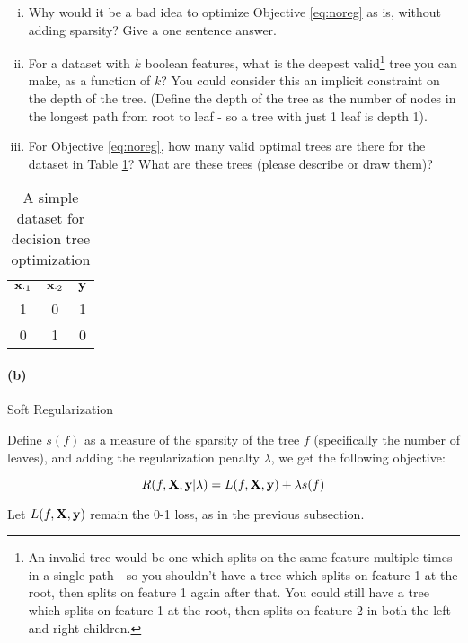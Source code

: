 \documentclass{exam}
\begin{document}
\begin{enumerate}[i.]
    \item {Why would it be a bad idea to optimize Objective \ref{eq:noreg} as is, without adding sparsity? Give a one sentence answer.}
    
    \item For a dataset with $k$ boolean features, what is the deepest valid\footnote{An invalid tree would be one which splits on the same feature multiple times in a single path - so you shouldn't have a tree which splits on feature 1 at the root, then splits on feature 1 again after that. You could still have a tree which splits on feature 1 at the root, then splits on feature 2 in both the left and right children.} tree you can make, as a function of $k$? You could consider this an implicit constraint on the depth of the tree. (Define the depth of the tree as the number of nodes in the longest path from root to leaf - so a tree with just 1 leaf is depth 1).
    
    \item For Objective \ref{eq:noreg}, how many valid optimal trees are there for the dataset in Table \ref{tab:noreg}? What are these trees (please describe or draw them)?
    
\end{enumerate}
\begin{table}[ht]
    \centering
    \begin{tabular}{cc|c}
        $\mathbf{x}_{\cdot1}$ & $\mathbf{x}_{\cdot2}$ & $\mathbf{y}$ \\
        1 & 0 & 1\\
        0 & 1 & 0 
    \end{tabular}
    \caption{A simple dataset for decision tree optimization}
    \label{tab:noreg}
\end{table}

\paragraph{(b)}Soft Regularization

Define $s(f)$ as a measure of the sparsity of the tree $f$ (specifically the number of leaves), and adding the regularization penalty $\lambda$, we get the following objective: 

\begin{equation}
\label{eq:softreg}
R(f, \mathbf{X}, \mathbf{y} | \lambda) = L(f, \mathbf{X}, \mathbf{y}) + \lambda s(f)
\end{equation}

Let $L(f, \mathbf{X}, \mathbf{y})$ remain the 0-1 loss, as in the previous subsection. 
\end{document}
